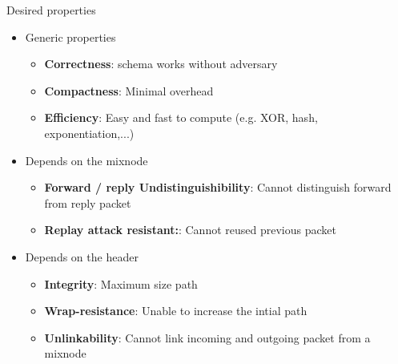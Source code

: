 \begin{frame}{Desired properties}
    \begin{itemize}
        \setlength\itemsep{4mm}
        \item {\normalsize Generic properties}
        \begin{itemize}
            \setlength\itemsep{2mm}
            \item {\color{lightgray}\textbf{\normalsize Correctness}: schema works without adversary}
            \item {\color{lightgray}\textbf{\normalsize Compactness}: Minimal overhead}
            \item {\color{lightgray}\textbf{\normalsize Efficiency}: Easy and fast to compute (e.g. XOR, hash, exponentiation,...)}
        \end{itemize}
        \item {\normalsize Depends on the mixnode}
        \begin{itemize}
            \setlength\itemsep{2mm}\item {\color{olive}\textbf{\normalsize Forward / reply Undistinguishibility}: Cannot distinguish forward from reply packet}
            \item {\color{olive}\textbf{\normalsize Replay attack resistant:}: Cannot reused previous packet}    
        \end{itemize}
        \item {\normalsize Depends on the header}
        \begin{itemize}
            \setlength\itemsep{2mm}
            \item {\color{olive}\textbf{\normalsize Integrity}: Maximum size path}
            \item {\color{orange}\textbf{\normalsize Wrap-resistance}: Unable to increase the intial path}
            \item {\color{red}\textbf{\normalsize Unlinkability}: Cannot link incoming and outgoing packet from a mixnode}
        \end{itemize}
    \end{itemize}
\end{frame}

